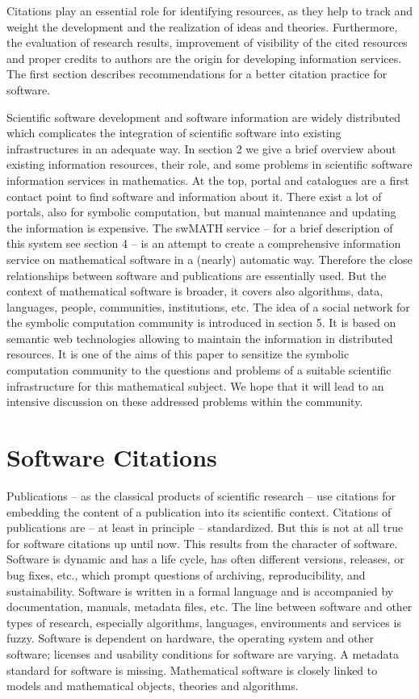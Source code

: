 \documentclass[12pt]{article}
\begin{document}
Citations play an essential role for identifying resources, as they help to
track and weight the development and the realization of ideas and theories.
Furthermore, the evaluation of research results, improvement of visibility of
the cited resources and proper credits to authors are the origin for developing
information services. The first section describes recommendations for a better
citation practice for software.

Scientific software development and software information are widely distributed
which complicates the integration of scientific software into existing
infrastructures in an adequate way. In section 2 we give a brief overview about
existing information resources, their \mbox{role}, and some problems in
scientific software information services in mathematics. At the top, portal and
catalogues are a first contact point to find software and information about
it. There exist a lot of portals, also for symbolic computation, but manual
maintenance and updating the information is expensive.  The swMATH service --
for a brief description of this system see section 4 -- is an attempt to create
a comprehensive information service on mathematical software in a (nearly)
automatic way. Therefore the close relationships between software and
publications are essentially used.  But the context of mathematical software is
broader, it covers also algorithms, data, languages, people, communities,
institutions, etc.  The idea of a social network for the symbolic computation
community is introduced in section 5. It is based on semantic web technologies
allowing to maintain the information in distributed resources. It is one of the
aims of this paper to sensitize the symbolic computation community to the
questions and problems of a suitable scientific infrastructure for this
mathematical subject. We hope that it will lead to an intensive discussion on
these addressed problems within the community.

\section{Software Citations}

Publications -- as the classical products of scientific research -- use
citations for embedding the content of a publication into its scientific
context. Citations of publications are -- at least in principle --
standardized. But this is not at all true for software citations up until
now. This results from the character of software. Software is dynamic and has a
life cycle, has often different versions, releases, or bug fixes, etc., which
prompt questions of archiving, reproducibility, and sustainability.  Software
is written in a formal language and is accompanied by documentation, manuals,
metadata files, etc. The line between software and other types of research,
especially algorithms, languages, environments and services is fuzzy. Software
is dependent on hardware, the operating system and other software; licenses and
usability conditions for software are varying. A metadata standard for software
is missing. Mathematical software is closely linked to models and mathematical
objects, theories and algorithms.
\end{document}

